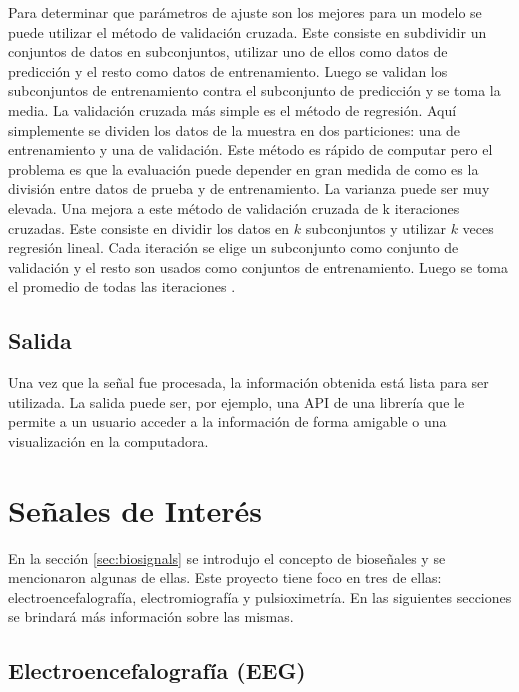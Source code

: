 Para determinar que parámetros de ajuste son los mejores para un modelo se puede utilizar el método de validación cruzada. Este consiste en subdividir un conjuntos de datos en subconjuntos, utilizar uno de ellos como datos de predicción y el resto como datos de entrenamiento. Luego se validan los subconjuntos de entrenamiento contra el subconjunto de predicción y se toma la media. La validación cruzada más simple es el método de regresión. Aquí simplemente se dividen los datos de la muestra en dos particiones: una de entrenamiento y una de validación. Este método es rápido de computar pero el problema es que la evaluación puede depender en gran medida de como es la división entre datos de prueba y de entrenamiento. La varianza puede ser muy elevada. Una mejora a este método de validación cruzada de k iteraciones cruzadas. Este consiste en dividir los datos en $k$ subconjuntos y utilizar   $k$ veces regresión lineal. Cada iteración se elige un subconjunto como conjunto de validación y el resto son usados como conjuntos de entrenamiento. Luego se toma el promedio de todas las iteraciones \cite{cross-validation}.

\subsection{Salida}

Una vez que la señal fue procesada, la información obtenida está lista para ser utilizada. La salida puede ser, por ejemplo, una API de una librería que le permite a un usuario acceder a la información de forma amigable o una visualización en la computadora.

\section{Señales de Interés}

En la sección \ref{sec:biosignals} se introdujo el concepto de bioseñales y se mencionaron algunas de ellas. Este proyecto tiene foco en tres de ellas: 
electroencefalografía, electromiografía y pulsioximetría. En las siguientes secciones se brindará más información sobre las mismas.

\subsection{Electroencefalografía (EEG)}

